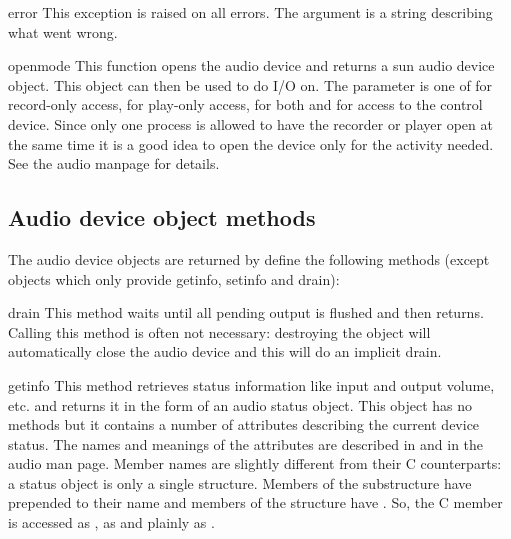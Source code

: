 \renewcommand{\indexsubitem}{(in module sunaudiodev)}
\begin{excdesc}{error}
This exception is raised on all errors. The argument is a string
describing what went wrong.
\end{excdesc}

\begin{funcdesc}{open}{mode}
This function opens the audio device and returns a sun audio device
object. This object can then be used to do I/O on. The  parameter
is one of  for record-only access,  for play-only
access,  for both and  for access to the
control device. Since only one process is allowed to have the recorder
or player open at the same time it is a good idea to open the device
only for the activity needed. See the audio manpage for details.
\end{funcdesc}

\subsection{Audio device object methods}

The audio device objects are returned by  define the
following methods (except  objects which only provide
getinfo, setinfo and drain):

\renewcommand{\indexsubitem}{(audio device method)}
\begin{funcdesc}{drain}{}
This method waits until all pending output is flushed and then returns.
Calling this method is often not necessary: destroying the object will
automatically close the audio device and this will do an implicit drain.
\end{funcdesc}

\begin{funcdesc}{getinfo}{}
This method retrieves status information like input and output volume,
etc. and returns it in the form of
an audio status object. This object has no methods but it contains a
number of attributes describing the current device status. The names
and meanings of the attributes are described in
 and in the audio man page. Member names
are slightly different from their C counterparts: a status object is
only a single structure. Members of the  substructure have
 prepended to their name and members of the 
structure have . So, the C member  is
accessed as ,  as 
and  plainly as .
\end{funcdesc}

